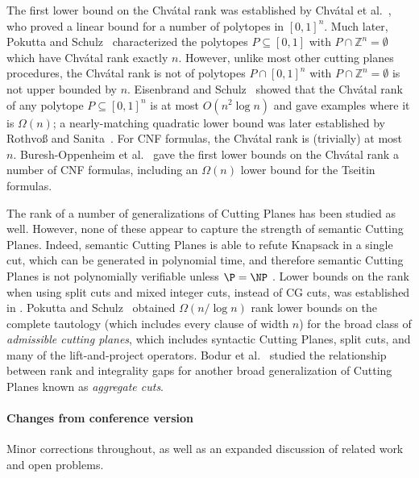 \documentclass[11pt]{article}
\begin{document}
The first lower bound on the Chv\'{a}tal rank was established by Chv\'{a}tal et al.~\cite{ChvatalCH89}, who proved a linear bound for a number of polytopes in $[0,1]^n$. Much later, Pokutta and Schulz~\cite{PokuttaS11a} characterized the polytopes $P \subseteq [0,1]$ with $P \cap \mathbb{Z}^n = \emptyset$ which have Chv\'{a}tal rank exactly $n$. However, unlike most other cutting planes procedures, the Chv\'{a}tal rank is not of polytopes $P \cap [0,1]^n$ with $P \cap \mathbb{Z}^n = \emptyset$ is not upper bounded by $n$. Eisenbrand and Schulz~\cite{EisenbrandS99} showed that the Chv\'{a}tal rank of any polytope $P \subseteq [0,1]^n$ is at most $O(n^2 \log n)$ and gave examples where it is $\Omega(n)$; a nearly-matching quadratic lower bound was later established by Rothvo{\ss} and Sanita~\cite{RothvossS13}.
For CNF formulas, the Chv\'{a}tal rank is (trivially) at most $n$. Buresh-Oppenheim et al.~\cite{BGHMP06} gave the first lower bounds on the Chv\'{a}tal rank  a number of CNF formulas, including an $\Omega(n)$ lower bound for the Tseitin formulas. 

The rank of a number of generalizations of Cutting Planes has been studied as well. However, none of these appear to capture the strength of semantic Cutting Planes. %
Indeed, semantic Cutting Planes is able to refute Knapsack in a single cut, which can be generated
%
in polynomial time,  %
and therefore semantic Cutting Planes is not polynomially verifiable unless $\P = \NP$ \cite{FilmusHL16}.
%
%
Lower bounds on the rank when using split cuts and mixed integer cuts, instead of CG cuts, was established in \cite{CornuejolsL02a}.  
Pokutta and Schulz~\cite{PokuttaS10} obtained $\Omega(n/\log n)$ rank lower bounds on the complete tautology (which includes every clause of width $n$) for the broad class of \emph{admissible cutting planes}, which includes syntactic Cutting Planes, split cuts, and many of the lift-and-project operators. Bodur et al.~\cite{BodurPDMP18} studied the relationship between rank and integrality gaps for another broad generalization of Cutting Planes known as \emph{aggregate cuts}. 

%
\paragraph{Changes from conference version \cite{conf-version}}

Minor corrections throughout, as well as an expanded discussion of related work and open problems.
\end{document}
